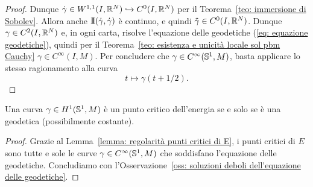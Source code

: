 \begin{proof}
	Dunque \(\dot \gamma \in W^{1,1}(I,\mathbb{R}^N) \hookrightarrow C^0(I,\mathbb{R}^N)\) per il Teorema~\ref{teo: immersione di Sobolev}. Allora anche \(\mathrm{I\!I}(\dot \gamma,\dot \gamma)\) è continuo, e quindi \(\ddot \gamma \in C^0(I,\mathbb{R}^N)\). Dunque \(\gamma \in C^2(I,\mathbb{R}^N)\) e, in ogni carta, risolve l'equazione delle geodetiche (\ref{eq: equazione geodetiche}), quindi per il Teorema~\ref{teo: esistenza e unicità locale sol pbm Cauchy} \(\gamma \in C^\infty(I,M)\). Per concludere che \(\gamma \in C^\infty(\mathbb{S}^1,M)\), basta applicare lo stesso ragionamento alla curva
	\[
		t \mapsto \gamma(t + 1/2).
	\] 
\end{proof}

\begin{teo}\label{teo: punto critico energia se e solo se geodetica}
	Una curva \(\gamma \in H^1(\mathbb{S}^1,M)\) è un punto critico dell'energia se e solo se è una geodetica (possibilmente costante).
\end{teo}
\begin{proof}
	Grazie al Lemma~\ref{lemma: regolarità punti critici di E}, i punti critici di \(E\) sono tutte e sole le curve \(\gamma \in C^\infty(\mathbb{S}^1,M)\) che soddisfano l'equazione delle geodetiche. Concludiamo con l'Osservazione~\ref{oss: soluzioni deboli dell'equazione delle geodetiche}.
\end{proof}
